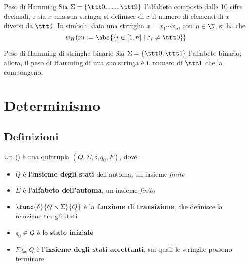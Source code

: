 \documentclass[a4paper, 12pt]{report}
\begin{document}
    \begin{frameddefn}{Peso di Hamming}
        Sia $\Sigma = \{\ttt 0, \ldots,  \ttt 9\}$ l'alfabeto composto dalle 10 cifre decimali, e sia $x$ una sua stringa; si definisce  di $x$ il numero di elementi di $x$ diversi da $\ttt 0$. In simboli, data una stringha $x = x_1 \cdots x_n$, con $n \in \N$, si ha che $$w_H(x) := \abs{\{i \in [1, n] \mid x_i \neq \ttt 0\}}$$
    \end{frameddefn}

    \begin{framedobs}{Peso di Hamming di stringhe binarie}
        Sia $\Sigma = \{ \ttt 0, \ttt 1 \}$ l'alfabeto binario; allora, il peso di Hamming di una sua stringa è il numero di $\ttt 1$ che la compongono.
    \end{framedobs}

    \section{Determinismo}

    \subsection{Definizioni}

    \begin{frameddefn}{\DFA}
        Un \textbf{\DFA} () è una quintupla $(Q, \Sigma, \delta, q_0, F)$, dove

        \begin{itemize}
            \item $Q$ è l'\textbf{insieme degli stati} dell'automa, un insieme \textit{finito}
            \item $\Sigma$ è l'\textbf{alfabeto dell'automa}, un insieme \textit{finito}
            \item $\func{\delta}{Q \times \Sigma}{Q}$ è la \textbf{funzione di transizione}, che definisce la relazione tra gli stati
            \item $q_0 \in Q$ è lo \textbf{stato iniziale}
            \item $F \subseteq Q$ è l'\textbf{insieme degli stati accettanti}, sui quali le stringhe possono terminare
        \end{itemize}

    \end{frameddefn}
\end{document}
